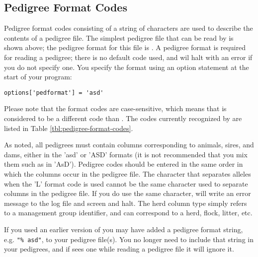\subsection{Pedigree Format Codes}
\label{sec:pedigree-format-codes}
Pedigree format codes consisting of a string of characters are used to describe
the contents of a pedigree file.  The simplest pedigree file that can be read by \PyPedal{}
is shown above; the pedigree format for this file is .  A pedigree format is required
for reading a pedigree; there is no default code used, and \PyPedal{} wil halt with an error if you
do not specify one.  You specify the format using an option statement at the start of your program:
\begin{verbatim}
options['pedformat'] = 'asd'
\end{verbatim}
Please note that the format codes are case-sensitive, which means that  is considered to be a different code than .  The codes currently recognized by \PyPedal{} are listed in Table \ref{tbl:pedigree-format-codes}.

As noted, all pedigrees must contain columns corresponding to animals, sires, and dams, either in the 'asd' or 'ASD' formats (it is not recommended that you mix them such as in 'AsD').  Pedigree codes should be entered in the same order in which the columns occur in the pedigree file.  The character that separates alleles when the 'L' format code is used cannot be the same character used to separate columns in the pedigree file.  If you do use the same character, \PyPedal{} will write an error message to the log file and screen and halt.  The herd column type simply refers to a management group identifier, and can
correspond to a herd, flock, litter, etc.

If you used an earlier version of \PyPedal{} you may have added a pedigree format string, e.g. \texttt{"\% asd"}, to your pedigree file(s).  You no longer need to include that string in your pedigrees, and if \PyPedal{} sees one while reading a pedigree file it will ignore it.

